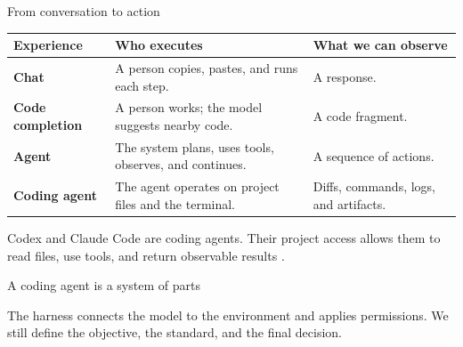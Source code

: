 \begin{frame}{From conversation to action}
  \small
  \begin{tabularx}{\textwidth}{@{}>{\bfseries}p{2.6cm}p{4.6cm}X@{}}
    \toprule
    Experience & Who executes & What we can observe \\
    \midrule
    Chat & A person copies, pastes, and runs each step. & A response. \\
    Code completion & A person works; the model suggests nearby code. & A code fragment. \\
    Agent & The system plans, uses tools, observes, and continues. & A sequence of actions. \\
    Coding agent & The agent operates on project files and the terminal. & Diffs, commands, logs, and artifacts. \\
    \bottomrule
  \end{tabularx}

  \vfill
  Codex and Claude Code are coding agents. Their project access allows them to
  read files, use tools, and return observable results
  \citep{openai2026codex,anthropic2025claudecode}.
\end{frame}

\begin{frame}{A coding agent is a system of parts}
  \begin{center}
  \end{center}

  \vspace{0.75em}
  The harness connects the model to the environment and applies permissions. We
  still define the objective, the standard, and the final decision.
\end{frame}

